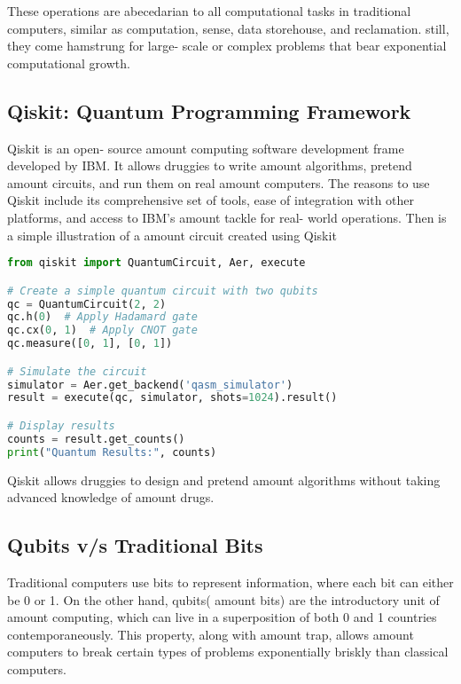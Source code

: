\documentclass[12pt,a4paper]{article}
\begin{document}
These operations are abecedarian to all computational tasks in traditional computers, similar as computation, sense, data storehouse, and reclamation. still, they come hamstrung for large- scale or complex problems that bear exponential computational growth.




\subsection{Qiskit: Quantum Programming Framework}
Qiskit is an open- source amount computing software development  frame developed by IBM. It allows  druggies to write amount algorithms,  pretend amount circuits, and run them on real amount computers. The reasons to use Qiskit include its comprehensive set of tools, ease of integration with other platforms, and access to IBM's amount  tackle for real- world  operations. Then is a simple  illustration of a amount circuit created using Qiskit 


\begin{tcolorbox}[title=Qiskit Example]
\begin{lstlisting}[language=Python]
from qiskit import QuantumCircuit, Aer, execute

# Create a simple quantum circuit with two qubits
qc = QuantumCircuit(2, 2)
qc.h(0)  # Apply Hadamard gate
qc.cx(0, 1)  # Apply CNOT gate
qc.measure([0, 1], [0, 1])

# Simulate the circuit
simulator = Aer.get_backend('qasm_simulator')
result = execute(qc, simulator, shots=1024).result()

# Display results
counts = result.get_counts()
print("Quantum Results:", counts)
\end{lstlisting}
\end{tcolorbox}

Qiskit allows druggies to design and pretend amount algorithms without taking advanced knowledge of amount drugs.

\subsection{Qubits v/s Traditional Bits}
 Traditional computers use bits to represent information, where each bit can either be 0 or 1. On the other hand, qubits( amount bits) are the  introductory unit of amount computing, which can  live in a superposition of both 0 and 1  countries  contemporaneously. This property, along with amount trap, allows amount computers to  break certain types of problems exponentially  briskly than classical computers. 
\end{document}
